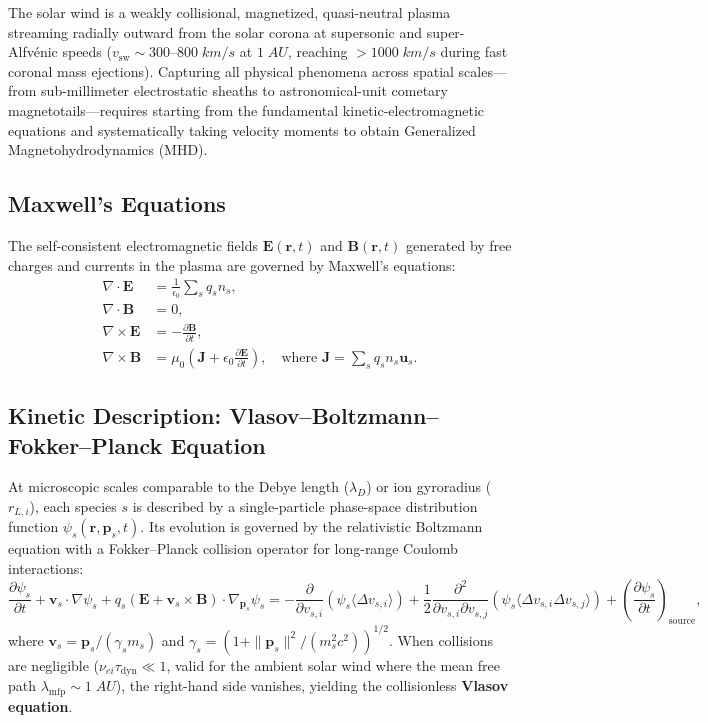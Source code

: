 \documentclass[11pt,a4paper]{article}
\newcommand{\vect}[1]{\bm{#1}}
\newcommand{\pderiv}[2]{\frac{\partial #1}{\partial #2}}
\begin{document}
The solar wind is a weakly collisional, magnetized, quasi-neutral plasma streaming radially outward from the solar corona at supersonic and super-Alfvénic speeds ($v_{\text{sw}} \sim 300\text{--}800\;\si{km/s}$ at $1\;\si{AU}$, reaching $>1000\;\si{km/s}$ during fast coronal mass ejections). Capturing all physical phenomena across spatial scales—from sub-millimeter electrostatic sheaths to astronomical-unit cometary magnetotails—requires starting from the fundamental kinetic-electromagnetic equations and systematically taking velocity moments to obtain Generalized Magnetohydrodynamics (MHD).

\subsection{Maxwell's Equations}
The self-consistent electromagnetic fields $\vect{E}(\vect{r},t)$ and $\vect{B}(\vect{r},t)$ generated by free charges and currents in the plasma are governed by Maxwell's equations:
\begin{align}
    \nabla \cdot \vect{E} &= \frac{1}{\epsilon_0} \sum_s q_s n_s, \label{eq:gauss_e} \\
    \nabla \cdot \vect{B} &= 0, \label{eq:gauss_b} \\
    \nabla \times \vect{E} &= -\pderiv{\vect{B}}{t}, \label{eq:faraday} \\
    \nabla \times \vect{B} &= \mu_0 \left( \vect{J} + \epsilon_0 \pderiv{\vect{E}}{t} \right), \quad \text{where } \vect{J} = \sum_s q_s n_s \vect{u}_s. \label{eq:ampere}
\end{align}

\subsection{Kinetic Description: Vlasov--Boltzmann--Fokker--Planck Equation}
At microscopic scales comparable to the Debye length ($\lambda_D$) or ion gyroradius ($r_{L,i}$), each species $s$ is described by a single-particle phase-space distribution function $\psi_s(\vect{r}, \vect{p}_s, t)$. Its evolution is governed by the relativistic Boltzmann equation with a Fokker--Planck collision operator for long-range Coulomb interactions:
\begin{equation}
    \pderiv{\psi_s}{t} + \vect{v}_s \cdot \nabla \psi_s + q_s \left( \vect{E} + \vect{v}_s \times \vect{B} \right) \cdot \nabla_{\vect{p}_s} \psi_s = -\pderiv{}{v_{s,i}} \left( \psi_s \langle \Delta v_{s,i} \rangle \right) + \frac{1}{2} \frac{\partial^2}{\partial v_{s,i} \partial v_{s,j}} \left( \psi_s \langle \Delta v_{s,i} \Delta v_{s,j} \rangle \right) + \left( \pderiv{\psi_s}{t} \right)_{\text{source}},
    \label{eq:boltzmann_fp}
\end{equation}
where $\vect{v}_s = \vect{p}_s / (\gamma_s m_s)$ and $\gamma_s = \left(1 + \|\vect{p}_s\|^2 / (m_s^2 c^2)\right)^{1/2}$. When collisions are negligible ($\nu_{ei} \tau_{\text{dyn}} \ll 1$, valid for the ambient solar wind where the mean free path $\lambda_{\text{mfp}} \sim 1\;\si{AU}$), the right-hand side vanishes, yielding the collisionless \textbf{Vlasov equation}.
\end{document}
